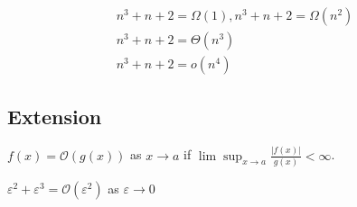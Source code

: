 \documentclass[11pt]{elegantbook}
\begin{document}
\begin{example}
\begin{equation}
    \begin{aligned}
        n^3+n+2=\Omega(1),n^3+n+2=\Omega(n^2)\\
        n^3+n+2=\Theta(n^3)\\
        n^3+n+2=o(n^4)
    \end{aligned}
    \nonumber
\end{equation}
\end{example}

\subsection{Extension}
$f(x)=\mathcal{O}(g(x))$ as $x \rightarrow a$ if $\lim \sup_{x \rightarrow a}\frac{|f(x)|}{g(x)}<\infty$.

\begin{example}
$\varepsilon^2+\varepsilon^3=\mathcal{O}(\varepsilon^2)$ as $\varepsilon \rightarrow 0$
\end{example}
\end{document}

